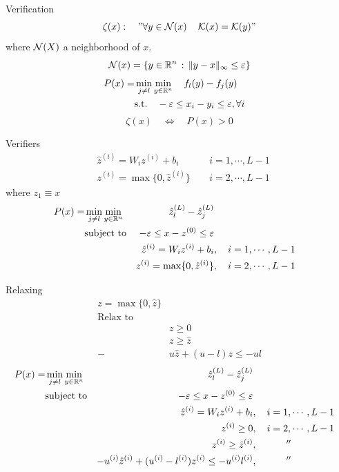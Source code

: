 \documentclass[aspectratio=169, 9pt]{beamer}
\theoremstyle{definition}
\begin{document}
\begin{frame}{Verification}
  \[
    \zeta(x):\quad "\forall y\in\mathcal{N}(x)\,\quad \mathcal{K}(x)=\mathcal{K}(y)"
  \]
  where $\mathcal{N}(X)$ a neighborhood of $x$.
  \[
    \mathcal{N}(x)=\{y\in\mathbb{R}^n\,:\, \|y-x\|_\infty \le \varepsilon\} 
  \]
  \[
    \begin{aligned}       
      P(x)=&\min _{j\ne l} \min_{y\in\mathbb{R}^n} \quad {\large f_l(y)-f_j(y)}&\\
      &\mbox{s.t.}\quad -\varepsilon\le x_i-y_i \le \varepsilon,\forall
      i&
    \end{aligned}
  \]
  \[
    \zeta(x)\quad\Leftrightarrow\quad P(x) > 0
  \]
\end{frame}
\begin{frame}{Verifiers}
  \[
    \begin{aligned}
      &\hat z^{(i)} = W_i z^{(i)} + b_i\,\quad &i=1,\cdots,L-1\\
      &z^{(i)} = \max\{0,\hat z^{(i)}\}\,\quad &i=2,\cdots,L-1
    \end{aligned}
  \]
  where $z_1\equiv x$
  \[
    \begin{aligned}
      P(x) = &\min _{j\ne l}\min_{y\in\mathbb{R}^n} &\hat z^{(L)}_l-\hat
      z^{(L)}_j\\
      &\mbox{subject to} &-\varepsilon\le x-z^{(0)} \le \varepsilon \\
      & & \hat z^{(i)} = W_i z^{(i)} + b_i&,\quad i=1,\cdots,L-1\\
      & & z^{(i)} = \max\{0,\hat z^{(i)}\}&,\quad i=2,\cdots,L-1\\
    \end{aligned}
  \]
\end{frame}
\begin{frame}{Relaxing}
  \[
    \begin{aligned}
    z = \max\{0,\hat z\}\\
    \mbox{Relax to}\\
    &z\ge 0\\
    &z \ge \hat z\\
    -&u \hat z +(u-l)z\le -ul
    \end{aligned}
  \]
  \[
    \begin{aligned}
      P(x) = &\min _{j\ne l}\min_{y\in\mathbb{R}^n} &\hat z^{(L)}_l-\hat
      z^{(L)}_j\\
      &\mbox{subject to} &-\varepsilon\le x-z^{(0)} \le \varepsilon&& \\
      & & \hat z^{(i)} = W_i z^{(i)} + b_i&,\quad i=1,\cdots,L-1\\
      & & z^{(i)}\ge 0&,\quad i=2,\cdots,L-1\\
      & & z^{(i)} \ge \hat z^{(i)}&,\quad\qquad ''\\
      & &-u^{(i)} \hat z^{(i)} +(u^{(i)}-l^{(i)})z^{(i)}\le
      -u^{(i)}l^{(i)}&,\quad\qquad ''&
    \end{aligned}
  \]
\end{frame}
\end{document}
